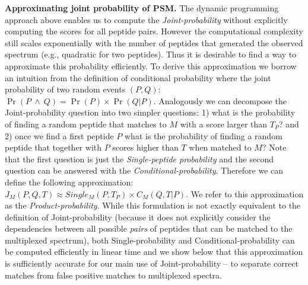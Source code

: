 \documentclass[arial,11pt]{article}
\begin{document}
{\bf Approximating joint probability of PSM.} The dynamic programming approach above enables us to compute the \emph{Joint-probability} without explicitly computing the scores for all peptide pairs. However the computational complexity still scales exponentially with the number of peptides that generated the observed spectrum (e.g., quadratic for two peptides).  Thus it is desirable to find a way to approximate this probability efficiently. To derive this approximation we borrow an intuition from the definition of conditional probability where the joint probability of two random events $(P,Q)$:
 $\Pr(P\ \wedge\ Q) = \Pr(P)\times \Pr(Q|P)$. Analogously we can decompose the Joint-probability question into two simpler questions: 1) what is the probability of finding a random peptide that matches to $M$ with a score larger than $T_{P}$? and 2) once we find a first peptide $P$ what is the probability of finding a random peptide that together with $P$ scores  higher than $T$ when matched to $M$?  Note that the first question is just the \emph{Single-peptide probability} and the second question can be answered with the \emph{Conditional-probability}. Therefore we can define the following approximation:
$J_M(P,Q,T) \approx Single_M(P,T_{P}) \times C_M(Q,T| P)$. We refer to this approximation as the \emph{Product-probability}. While this formulation is not exactly equivalent to the definition of Joint-probability (because it does not explicitly consider the dependencies between all possible {\em pairs} of peptides that can be matched to the multiplexed spectrum), both Single-probability and Conditional-probability can be computed efficiently in linear time and we show below that this approximation is sufficiently accurate for our main use of Joint-probability -- to separate correct matches from false positive matches to multiplexed spectra.

\end{document}
